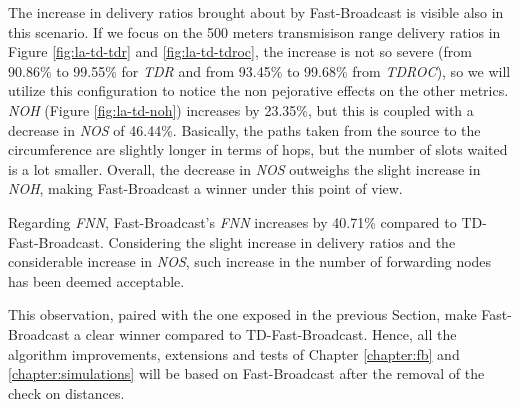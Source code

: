 		The increase in delivery ratios brought about by Fast-Broadcast is visible also in this scenario. If we focus on the 500 meters transmisison range delivery ratios in Figure \ref{fig:la-td-tdr} and \ref{fig:la-td-tdroc}, the increase is not so severe (from 90.86\% to 99.55\% for \textit{TDR} and from 93.45\% to 99.68\% from \textit{TDROC}), so we will utilize this configuration to notice the non pejorative effects on the other metrics.
		\textit{NOH} (Figure \ref{fig:la-td-noh}) increases by 23.35\%, but this is coupled with a decrease in \textit{NOS} of 46.44\%. Basically, the paths taken from the source to the circumference are slightly longer in terms of hops, but the number of slots waited is a lot smaller. Overall, the decrease in \textit{NOS} outweighs the slight increase in \textit{NOH}, making Fast-Broadcast a winner under this point of view.
		
		
		Regarding \textit{FNN}, Fast-Broadcast's \textit{FNN} increases by 40.71\% compared to TD-Fast-Broadcast. Considering the slight increase in delivery ratios and the considerable increase in \textit{NOS}, such increase in the number of forwarding nodes has been deemed acceptable. 
		
		
		This observation, paired with the one exposed in the previous Section, make Fast-Broadcast a clear winner compared to TD-Fast-Broadcast. Hence, all the algorithm improvements, extensions and tests of Chapter \ref{chapter:fb} and \ref{chapter:simulations} will be based on Fast-Broadcast after the removal of the check on distances.
		
		